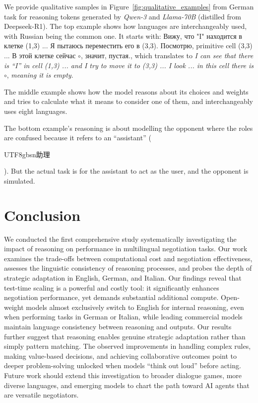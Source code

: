 \documentclass[11pt]{article}
\begin{document}
We provide qualitative samples in Figure~\ref{fig:qualitative_examples} from German task for reasoning tokens generated by \textit{Qwen-3} and \textit{Llama-70B} (distilled from Deepseek-R1). The top example shows how languages are interchangeably used, with Russian being the common one. It starts with: \foreignlanguage{russian}{Вижу, что} "I" \foreignlanguage{russian}{находится в клетке (1,3) ... Я пытаюсь переместить его в (3,3). Посмотрю,} primitive cell (3,3) \foreignlanguage{russian}{... В этой клетке сейчас $\circ$, значит, пустая.}, which translates to \textit{I can see that there is ``I'' in cell (1,3) ... and I try to move it  to (3,3) ... I look ... in this cell there is} $\circ$, \textit{meaning it is empty}.

The middle example shows how the model reasons about its choices and weights and tries to calculate what it means to consider one of them, and interchangeably uses eight languages.

The bottom example's reasoning is about modelling the opponent where the roles are confused because it refers to an ``assistant'' (\begin{CJK*}{UTF8}{gbsn}助理\end{CJK*}). But the actual task is for the assistant to act as the user, and the opponent is simulated.





\section{Conclusion}

We conducted the first comprehensive study systematically investigating the impact of reasoning on performance in multilingual negotiation tasks. 
Our work examines the trade-offs between computational cost and negotiation effectiveness, assesses the linguistic consistency of reasoning processes, and probes the depth of strategic adaptation in English, German, and Italian. Our findings reveal that test-time scaling is a powerful and costly tool: it significantly enhances negotiation performance, yet demands substantial additional compute. 
Open-weight models almost exclusively switch to English for internal reasoning, even when performing tasks in German or Italian, while leading commercial models maintain language consistency between reasoning and outputs. Our results further suggest that reasoning enables genuine strategic adaptation rather than simply pattern matching. The observed improvements in handling complex rules, making value-based decisions, and achieving collaborative outcomes point to deeper problem-solving unlocked when models ``think out loud'' before acting. 
Future work should extend this investigation to broader dialogue games, more diverse languages, and emerging models to chart the path toward AI agents that are versatile negotiators.
\end{document}
